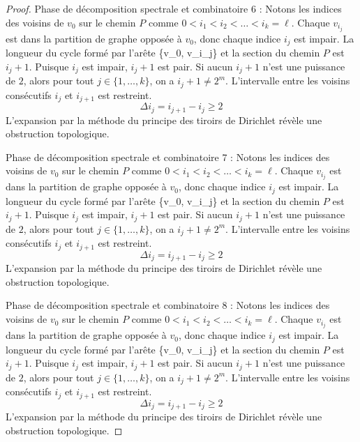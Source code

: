 \documentclass[11pt,a4paper]{article}
\theoremstyle{definition}
\begin{document}
\begin{proof}
Phase de décomposition spectrale et combinatoire 6 :
Notons les indices des voisins de $v_0$ sur le chemin $P$ comme $0 < i_1 < i_2 < \dots < i_k = \ell$.
Chaque $v_{i_j}$ est dans la partition de graphe opposée à $v_0$, donc chaque indice $i_j$ est impair.
La longueur du cycle formé par l'arête \{v_0, v_{i_j}\} et la section du chemin $P$ est $i_j + 1$.
Puisque $i_j$ est impair, $i_j + 1$ est pair.
Si aucun $i_j + 1$ n'est une puissance de $2$, alors pour tout $j \in \{1, \dots, k\}$, on a $i_j + 1 \neq 2^m$.
L'intervalle entre les voisins consécutifs $i_j$ et $i_{j+1}$ est restreint.
\begin{equation}
\Delta i_j = i_{j+1} - i_j \ge 2
\end{equation}
L'expansion par la méthode du principe des tiroirs de Dirichlet révèle une obstruction topologique.

Phase de décomposition spectrale et combinatoire 7 :
Notons les indices des voisins de $v_0$ sur le chemin $P$ comme $0 < i_1 < i_2 < \dots < i_k = \ell$.
Chaque $v_{i_j}$ est dans la partition de graphe opposée à $v_0$, donc chaque indice $i_j$ est impair.
La longueur du cycle formé par l'arête \{v_0, v_{i_j}\} et la section du chemin $P$ est $i_j + 1$.
Puisque $i_j$ est impair, $i_j + 1$ est pair.
Si aucun $i_j + 1$ n'est une puissance de $2$, alors pour tout $j \in \{1, \dots, k\}$, on a $i_j + 1 \neq 2^m$.
L'intervalle entre les voisins consécutifs $i_j$ et $i_{j+1}$ est restreint.
\begin{equation}
\Delta i_j = i_{j+1} - i_j \ge 2
\end{equation}
L'expansion par la méthode du principe des tiroirs de Dirichlet révèle une obstruction topologique.

Phase de décomposition spectrale et combinatoire 8 :
Notons les indices des voisins de $v_0$ sur le chemin $P$ comme $0 < i_1 < i_2 < \dots < i_k = \ell$.
Chaque $v_{i_j}$ est dans la partition de graphe opposée à $v_0$, donc chaque indice $i_j$ est impair.
La longueur du cycle formé par l'arête \{v_0, v_{i_j}\} et la section du chemin $P$ est $i_j + 1$.
Puisque $i_j$ est impair, $i_j + 1$ est pair.
Si aucun $i_j + 1$ n'est une puissance de $2$, alors pour tout $j \in \{1, \dots, k\}$, on a $i_j + 1 \neq 2^m$.
L'intervalle entre les voisins consécutifs $i_j$ et $i_{j+1}$ est restreint.
\begin{equation}
\Delta i_j = i_{j+1} - i_j \ge 2
\end{equation}
L'expansion par la méthode du principe des tiroirs de Dirichlet révèle une obstruction topologique.


\end{proof}
\end{document}
